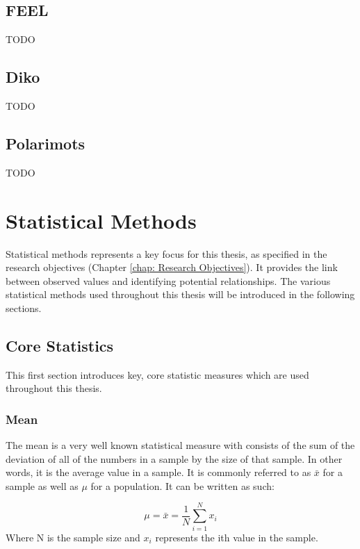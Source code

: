 \subsection{FEEL}\label{chap: feel}

TODO

\subsection{Diko}\label{chap: diko}

TODO

\subsection{Polarimots}\label{chap: polarimots}

TODO

\section{Statistical Methods}\label{Statistical Methods}

Statistical methods represents a key focus for this thesis, as specified in the research objectives (Chapter \ref{chap: Research Objectives}). It provides the link between observed values and identifying potential relationships. The various statistical methods used throughout this thesis will be introduced in the following sections.

\subsection{Core Statistics}

This first section introduces key, core statistic measures which are used throughout this thesis.

\subsubsection{Mean}

The mean is a very well known statistical measure with consists of the sum of the deviation of all of the numbers in a sample by the size of that sample. In other words, it is the average value in a sample. It is commonly referred to as $\bar{x}$ for a sample as well as $\mu$ for a population. It can be written as such:

\begin{equation}
    \mu = \bar{x} = \frac{1}{N}\sum^{N}_{i=1} x_{i}
\end{equation}
Where N is the sample size and $x_{i}$ represents the ith value in the sample.

